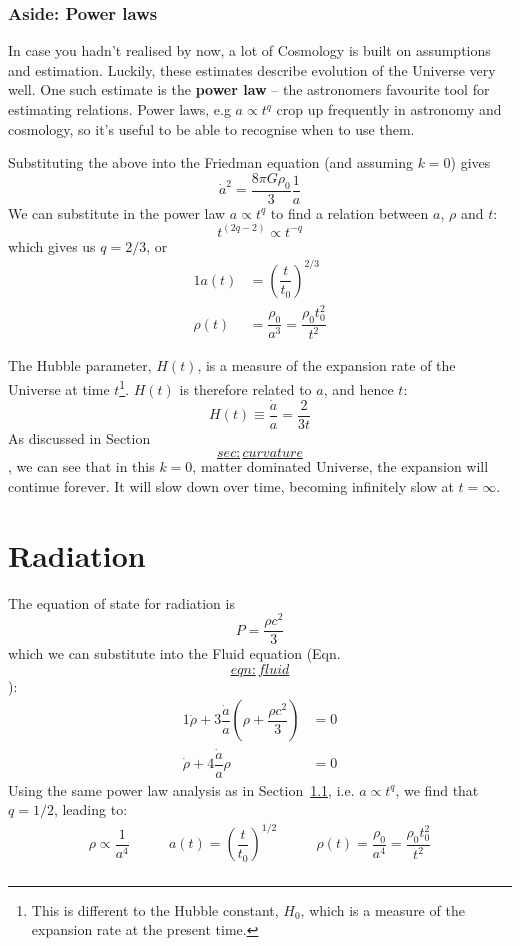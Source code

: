 \documentclass[]{book}
\let\rmarkdownfootnote\footnote%
\def\footnote{\protect\rmarkdownfootnote}
\begin{document}
\subsubsection*{Aside: Power laws}\label{aside-power-laws}

In case you hadn't realised by now, a lot of Cosmology is built on
assumptions and estimation. Luckily, these estimates describe evolution
of the Universe very well. One such estimate is the \textbf{power law}
-- the astronomers favourite tool for estimating relations. Power laws,
e.g \(a \propto t^q\) crop up frequently in astronomy and cosmology, so
it's useful to be able to recognise when to use them.

Substituting the above into the Friedman equation (and assuming \(k=0\))
gives \[\dot{a}^2 = \dfrac{8\pi G \rho_0}{3}\dfrac{1}{a}\] We can
substitute in the power law \(a \propto t^q\) to find a relation between
\(a\), \(\rho\) and \(t\): \[t^{(2q-2)} \propto t^{-q}\] which gives us
\(q = 2/3\), or \[\begin{aligned}
{1}
    a(t) &= \left(\dfrac{t}{t_0}\right)^{2/3}\\
    \rho(t) &= \dfrac{\rho_0}{a^3} = \dfrac{\rho_0 t_{0}^{2}}{t^2}\end{aligned}\]

The Hubble parameter, \(H(t)\), is a measure of the expansion rate of
the Universe at time \(t\)\footnote{This is different to the Hubble
  constant, \(H_0\), which is a measure of the expansion rate at the
  present time.}. \(H(t)\) is therefore related to \(a\), and hence
\(t\): \[H(t) \equiv \dfrac{\dot{a}}{a} = \dfrac{2}{3t}\] As discussed
in Section~\protect\hyperlink{sec:curvature}{\[sec:curvature\]}, we can
see that in this \(k=0\), matter dominated Universe, the expansion will
continue forever. It will slow down over time, becoming infinitely slow
at \(t=\infty\).

\hypertarget{sec:radiation_eos}{\section{Radiation}\label{sec:radiation_eos}}

The equation of state for radiation is \[P = \dfrac{\rho c^2}{3}\] which
we can substitute into the Fluid equation
(Eqn.~\protect\hyperlink{eqn:fluid}{\[eqn:fluid\]}): \[\begin{aligned}
{1}
    \dot{\rho} + 3\dfrac{\dot{a}}{a}\left(\rho + \dfrac{\rho c^2}{3}\right) &= 0\\
    \dot{\rho} + 4\dfrac{\dot{a}}{a}\rho &= 0\end{aligned}\] Using the
same power law analysis as in
Section~\protect\hyperlink{sec:matter_eos}{1.1}, i.e. \(a \propto t^q\),
we find that \(q = 1/2\), leading to: \[\begin{array}{lcr}
    \rho \propto \dfrac{1}{a^4} & \qquad a(t) = \left(\dfrac{t}{t_0}\right)^{1/2} & \qquad \rho(t) = \dfrac{\rho_0}{a^4} = \dfrac{\rho_0 t_0^2}{t^2}\\
    \end{array}\]
\end{document}
